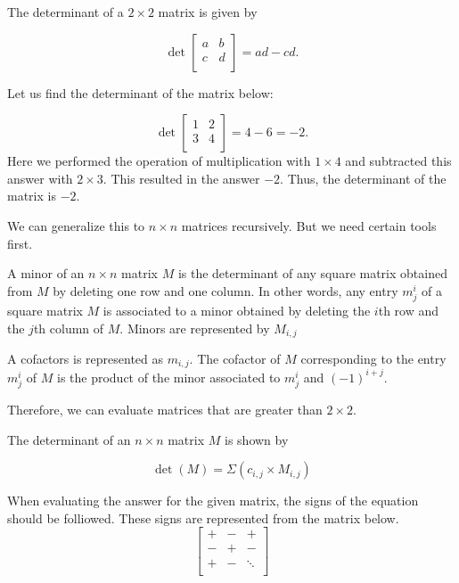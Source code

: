 \begin{definition}
    The determinant of a $2 \times 2$ matrix is given by    
\end{definition}
 \[
     \det\begin{bmatrix}
         a & b \\
         c & d  \\ 
     \end{bmatrix} 
    = ad - cd. \]

\begin{exmp}
  Let us find the determinant of the matrix below: 

$$\det \begin{bmatrix}
       1 & 2 \\
       3 & 4  \\ 
    \end{bmatrix}
    = 4 - 6 = -2.$$
Here we performed the operation of multiplication with $1 \times 4$ and subtracted this answer with $2 \times 3$.  This resulted in the answer $-2$. Thus, the determinant of the matrix is $-2$. \\
\end{exmp}

We can generalize this to $n \times n$ matrices recursively. But we need certain tools first. \\
\begin{definition}[Minors]
    A minor of an $n\times n$ matrix $M$ is the determinant of any square matrix obtained from $M$ by deleting one row and one column. In other words, any entry $m^{i}_{j}$ of a square matrix $M$ is associated to a minor obtained by deleting the $i$th row and the $j$th column of $M$.  Minors are represented by $M_{i,j}$
\end{definition}
\begin{definition}[Cofactors]
    A cofactors is represented as $m_{i,j}$.  The cofactor of $M$ corresponding to the entry $m_{j}^{i}$ of $M$ is the product of the minor associated to $m_{j}^{i}$ and $(-1)^{i+j}$. 
\end{definition}

Therefore, we can evaluate matrices that are greater than $2 \times 2$.

\begin{definition}
    The determinant of an $n \times n$ matrix $M$ is shown by

   $$ \det(M) = \Sigma (c_{i,j} \times M_{i,j}) $$

\end{definition}
When evaluating the answer for the given matrix, the signs of the equation should be folliowed. These signs are represented from the matrix below.
\[
\begin{bmatrix}
    +  & - & + \\
    -  & + & - \\
    +  & - & \ddots \\
    
\end{bmatrix}
  \]  

